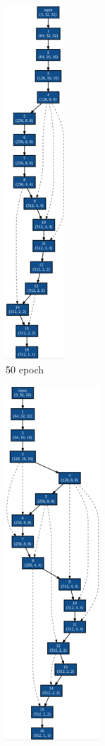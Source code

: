 \begin{figure}[tb]
 \begin{minipage}{0.3\hsize}
 	\begin{center}
 		\includegraphics[clip,scale=0.8]{./fig/04.exp/b50.png}\\
 		50 epoch
 	\end{center}
 \end{minipage}
 \begin{minipage}{0.3\hsize}
 	\begin{center}
    \includegraphics[clip,scale=0.8]{./fig/04.exp/b100.png}\\

\end{center}
\end{minipage}
\end{figure}
